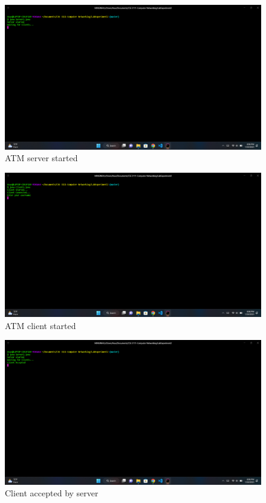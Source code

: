 \documentclass[11pt]{article}
\begin{document}
\begin{figure}[!h]
\centering
\includegraphics[width=\textwidth]{116.png}
\caption{ATM server started}
\end{figure}


\newpage


\begin{figure}[!h]
\centering
\includegraphics[width=\textwidth]{117.png}
\caption{ATM client started}
\end{figure}

\begin{figure}[!h]
\centering
\includegraphics[width=\textwidth]{118.png}
\caption{Client accepted by server}
\end{figure}
\end{document}
